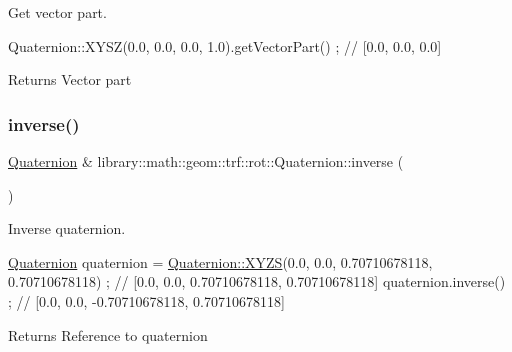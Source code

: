Get vector part. 


\begin{DoxyCode}
Quaternion::XYSZ(0.0, 0.0, 0.0, 1.0).getVectorPart() ; \textcolor{comment}{// [0.0, 0.0, 0.0]}
\end{DoxyCode}


\begin{DoxyReturn}{Returns}
Vector part 
\end{DoxyReturn}
\mbox{\label{classlibrary_1_1math_1_1geom_1_1trf_1_1rot_1_1_quaternion_a596228c41391cbba85ca425d9c7c3dbd}} 
\subsubsection{\texorpdfstring{inverse()}{inverse()}}
{\footnotesize\ttfamily \hyperlink{classlibrary_1_1math_1_1geom_1_1trf_1_1rot_1_1_quaternion}{Quaternion} \& library\+::math\+::geom\+::trf\+::rot\+::\+Quaternion\+::inverse (\begin{DoxyParamCaption}{ }\end{DoxyParamCaption})}



Inverse quaternion. 


\begin{DoxyCode}
\hyperlink{classlibrary_1_1math_1_1geom_1_1trf_1_1rot_1_1_quaternion_aa7f459a08f5af38b9f7676a6bf36a21c}{Quaternion} quaternion = \hyperlink{classlibrary_1_1math_1_1geom_1_1trf_1_1rot_1_1_quaternion_afff9523c7dcbfbbc521736121e62ad41}{Quaternion::XYZS}(0.0, 0.0, 0.70710678118, 0.70710678118) 
      ; \textcolor{comment}{// [0.0, 0.0, 0.70710678118, 0.70710678118]}
quaternion.inverse() ; \textcolor{comment}{// [0.0, 0.0, -0.70710678118, 0.70710678118]}
\end{DoxyCode}


\begin{DoxyReturn}{Returns}
Reference to quaternion 
\end{DoxyReturn}
\mbox{\label{classlibrary_1_1math_1_1geom_1_1trf_1_1rot_1_1_quaternion_a0d74102b65b5fdb0cd92f37455cf8c66}} 
